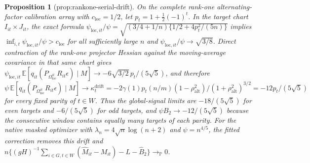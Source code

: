 \documentclass{article}
\newtheorem{proposition}{Proposition}
\begin{document}
\begin{proposition}[prop:rankone-serial-drift]\label{prop:rankone-serial-drift}
On the complete rank-one alternating-factor calibration array with \(c_{\mathrm{loc}}=1/2\), let \(p_t=1+\tfrac12(-1)^t\). In the target chart \(I_{it}\times J_{it}\), the exact formula \(\psi_{\mathrm{loc},it}/\psi=\sqrt{(3/4+1/n)\{1/2+4p_t^2/(5n)\}}\) implies \(\inf_{i,t}\psi_{\mathrm{loc},it}/\psi>c_{\mathrm{loc}}\) for all sufficiently large \(n\) and \(\psi_{\mathrm{loc},it}/\psi\to\sqrt{3/8}\). Direct contraction of the rank-one projector Hessian against the moving-average covariance in that same chart gives \(\psi_{\mathrm{loc},it}\,\mathbb E[q_{it}(P_{\Omega_{\mathrm{loc}}^{it}}R_{it}\epsilon)\mid M]\to-6\sqrt{3/2}\,p_t/(5\sqrt5)\), and therefore \(\psi\,\mathbb E[q_{it}(P_{\Omega_{\mathrm{loc}}^{it}}R_{it}\epsilon)\mid M]\to\kappa^{\mathrm{drift}}_t=-2\gamma(1)p_t(n/m)(1-\rho_{\mathrm{alt}}^2)/(1+\rho_{\mathrm{alt}}^2)^{3/2}=-12p_t/(5\sqrt5)\) for every fixed parity of \(t\in W\). Thus the global-signal limits are \(-18/(5\sqrt5)\) for even targets and \(-6/(5\sqrt5)\) for odd targets, and \(\psi B_2\to-12/(5\sqrt5)\) because the consecutive window contains equally many targets of each parity. For the native masked optimizer with \(\lambda_n=4\sqrt n\log(n+2)\) and \(\psi=n^{4/5}\), the fitted correction removes this drift and \(n\{(gH)^{-1}\sum_{i\in G,t\in W}(\widehat M_{it}-M_{it})-L-\widehat B_2\}\to_{\mathbb P}0\).
\end{proposition}
\end{document}
